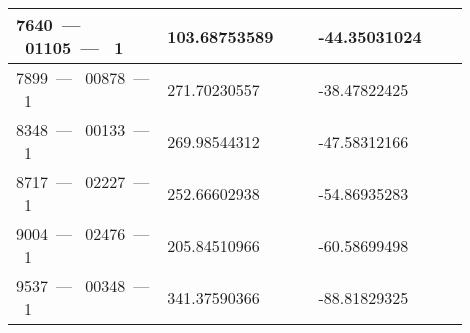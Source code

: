 \documentclass[11pt]{article}
\begin{document}
\begin{table}[h]
\begin{center}
\begin{tabular}{ | m{0.3\linewidth} || m{0.3\linewidth} | m{0.3\linewidth} | }
                7640\ --- \ 01105\ --- \ 1 & 103.68753589 & -44.35031024 \\ \hline
                7899\ --- \ 00878\ --- \ 1 & 271.70230557 & -38.47822425 \\ \hline
                8348\ --- \ 00133\ --- \ 1 & 269.98544312 & -47.58312166 \\ \hline
                8717\ --- \ 02227\ --- \ 1 & 252.66602938 & -54.86935283 \\ \hline
                9004\ --- \ 02476\ --- \ 1 & 205.84510966 & -60.58699498 \\ \hline
                9537\ --- \ 00348\ --- \ 1 & 341.37590366 & -88.81829325 \\ \hline
            \end{tabular}
        \end{center}
    \end{table}
\end{document}
